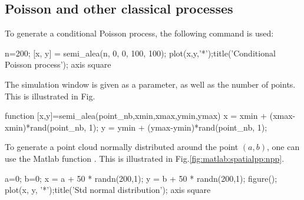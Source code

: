 \def\QRCODE{TB_IPR_TUT.IMG.point_processes_generation_matlabqrcode.png}
\def\QRPAGE{http://www.iptutorials.science/tree/master/TB_IPR/TUT.IMG.point_processes_generation/matlab}

\subsection{Poisson and other classical processes}
To generate a conditional Poisson process, the following command is used:
\begin{matlab}
n=200;
[x, y] = semi_alea(n, 0, 0, 100, 100);
plot(x,y,'*');title('Conditional Poisson process');
axis square
\end{matlab}
The simulation window is given as a parameter, as well as the number of points. This is illustrated in Fig.

\begin{matlab}
function [x,y]=semi_alea(point_nb,xmin,xmax,ymin,ymax)
x = xmin + (xmax-xmin)*rand(point_nb, 1);
y = ymin + (ymax-ymin)*rand(point_nb, 1);
\end{matlab}



To generate a point cloud normally distributed around the point $(a,b)$, one can use the Matlab function . This is illustrated in Fig.\ref{fig:matlab:spatialpp:npp}.

\begin{matlab}
a=0;
b=0;
x = a + 50 * randn(200,1);
y = b + 50 * randn(200,1);
figure();
plot(x, y, '*');title('Std normal distribution');
axis square
\end{matlab}


